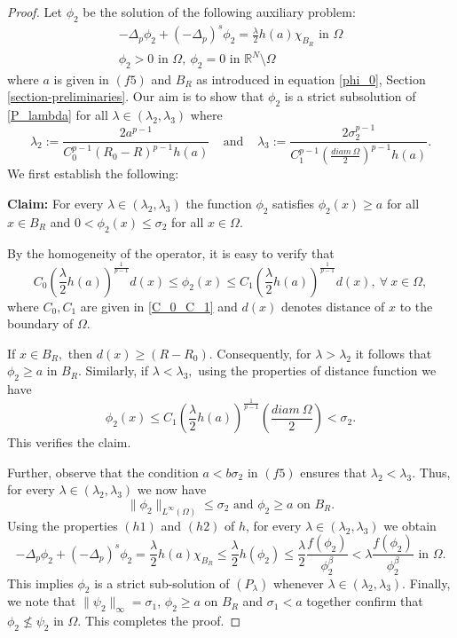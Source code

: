 \documentclass[reqno,oneside]{amsart}
\theoremstyle{definition}
\theoremstyle{remark}
\numberwithin{equation}{section}
\newcommand{\p}{\Delta_p}
\newcommand{\ps}{(-\Delta_p)^s}
\newcommand{\la} {\lambda}
\newcommand{\ba}{\beta}
\newcommand{\Om} {\Omega}
\newcommand{\si}{\sigma}
\newcommand{\bdry}{\mathbb{R}^N \setminus \Omega}
\begin{document}
\begin{proof}
   Let $\phi_2$ be the solution of the following auxiliary problem:
   \begin{equation*}
       \begin{aligned}
           -\p \phi_2 + \ps \phi_2 = \frac{\la}{2} h(a) \chi_{B_R} \text{ in } \Om\\
           \phi_2 > 0 \text{ in } \Om,\ \phi_2 =0 \text{ in } \bdry
       \end{aligned}
   \end{equation*}
   where $a$ is given in $(f5)$ and $B_R$ as introduced in equation \eqref{phi_0}, Section \ref{section-preliminaries}. Our aim is to show that $\phi_2$ is a strict subsolution of \eqref{P_lambda} for all $\la\in (\lambda_2,\lambda_3)$ where
   \begin{equation}\label{lambda_2}
       \lambda_2:= \frac{2a^{p-1}}{C_0^{p-1} (R_0 - R)^{p-1} h(a)}\;\;\;\;\mbox{and} \;\;\;\; \lambda_3:= \frac{2\si_2^{p-1}}{C_1^{p-1} \left( \frac{diam\ \Om}{2}\right)^{p-1} h(a)}.
   \end{equation}
   We first establish the following:
   
   \noindent\textbf{Claim:} For every $ \lambda\in (\la_2,\la_3)$ the function $\phi_2$ satisfies $\phi_2(x)\geq a$ for all $x\in B_R$ and $0<\phi_2(x)\leq \sigma_2$ for all $x\in \Omega$.
   
   By the homogeneity of the operator, it is easy to verify that
   \begin{equation}\label{est_second_subsolution}
       C_0 \left(\frac{\la}{2} h(a) \right)^{\frac{1}{p-1}} d(x) \leq \phi_2 (x) \leq C_1 \left(\frac{\la}{2} h(a) \right)^{\frac{1}{p-1}} d(x),\ \forall\ x\in\Om,
   \end{equation}
   where $C_0,C_1$ are given in \eqref{C_0_C_1} and $d(x)$ denotes distance of $x$ to the boundary of $\Omega$. 
   
   If $x\in B_R,$ then $d(x)\geq (R-R_0).$ Consequently, for $\la>\la_2$ it follows that $\phi_2 \geq a$ in $B_R.$ Similarly, if $\la<\la_3,$ using the properties of distance function we have $$ \phi_2(x)\leq C_1 \left(\frac{\la}{2} h(a) \right)^{\frac{1}{p-1}} \left(\frac{diam\ \Om}{2}\right) < \si_2 .$$ This verifies the claim.
    
    Further, observe that the condition $a< b\si_2$ in $(f5)$ ensures that $\la_2 < \la_3.$ Thus, for every 
    $\la\in(\la_2,\la_3)$ we now have 
    $$\|\phi_2\|_{L^\infty(\Omega)} \leq \si_2 \mbox{ and }\phi_2 \geq a \mbox{ on } B_R.$$
    Using the properties $(h1)$ and $(h2)$ of $h$, for every $\la\in(\la_2,\la_3)$ we obtain 
    \begin{equation*}
        -\p \phi_2 + \ps \phi_2= \frac{\la}{2} h(a)\chi_{B_R} \leq \frac{\la}{2} h(\phi_2) \leq \frac{\la}{2} \frac{f(\phi_2)}{\phi_2^{\ba}} < \la \frac{f(\phi_2)}{\phi_2^{\ba}} \text{ in } \Om.
    \end{equation*}
    This implies $\phi_2$ is a strict sub-solution of $(P_\la)$ whenever $\la\in(\la_2,\la_3).$ Finally, we note that $\|\psi_2\|_{\infty} = \si_1$, $\phi_2 \geq a$ on $B_R$ and $\si_1 < a$ together confirm that $\phi_2 \not\leq \psi_2$ in $\Om$. This completes the proof.
\end{proof}
    
\end{document}
